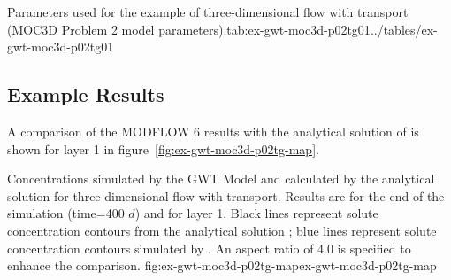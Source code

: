 \begin{StandardTable}{Parameters used for the example of three-dimensional flow with transport (MOC3D Problem 2 model parameters).}{tab:ex-gwt-moc3d-p02tg01}{../tables/ex-gwt-moc3d-p02tg01}
\end{StandardTable}

\subsection{Example Results}

A comparison of the MODFLOW 6 results with the analytical solution of \cite{wexler1992} is shown for layer 1 in figure~\ref{fig:ex-gwt-moc3d-p02tg-map}.

\begin{StandardFigure}{
                                     Concentrations simulated by the \mf GWT Model and calculated by the analytical solution for three-dimensional flow with transport.  Results are for the end of the simulation (time=400 $d$) and for layer 1.  Black lines represent solute concentration contours from the analytical solution \citep{wexler1992}; blue lines represent solute concentration contours simulated by \mf.  An aspect ratio of 4.0 is specified to enhance the comparison.
                                     }{fig:ex-gwt-moc3d-p02tg-map}{ex-gwt-moc3d-p02tg-map}
\end{StandardFigure}            

                
